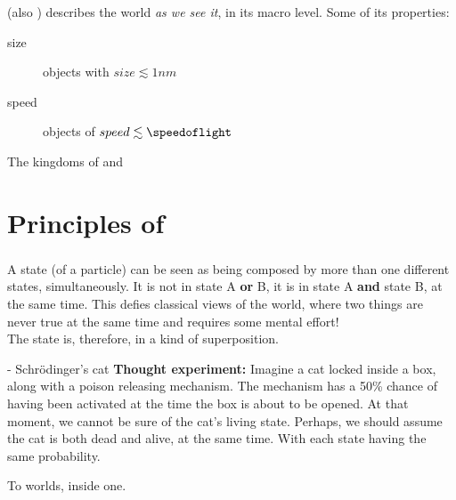 \documentclass[aspectratio=43]{beamer}
\begin{document}
\begin{frame}{\qp}
\begin{card}
    \qp (also \qm) describes the world \textit{as we see it}, in its macro level. Some of its properties:
    \begin{description}
        \item[size] objects with $size \lesssim 1nm$
        \item[speed] objects of $speed \lesssim \speedoflight$
    \end{description}
\end{card}
\pagenumber
\end{frame}

\begin{frame}{The kingdoms of \cl and \qm}
\begin{card}
    \centering{}
\end{card}
\pagenumber
\end{frame}

\section{Principles of \qm}
\subsubsection{\qsp}
\begin{frame}{\qsp}
    \begin{card}
        A \q state (of a particle) can be seen as being composed by more than one different states, simultaneously. It is not in state A \textbf{or} B, it is in state A \textbf{and} state B, at the same time. This defies classical views of the world, where two things are never true at the same time and requires some mental effort!\\
        The state is, therefore, in a kind of superposition.
    \end{card}
\pagenumber
\end{frame}

\begin{frame}{\qsp - Schrödinger's cat}
    \textbf{Thought experiment:} Imagine a cat locked inside a box, along with a poison releasing mechanism. The mechanism has a 50\% chance of having been activated at the time the box is about to be opened. At that moment, we cannot be sure of the cat's living state. Perhaps, we should assume the cat is both dead and alive, at the same time. With each state having the same probability.
    \begin{center}
    \end{center}
    \begin{center}
        To worlds, inside one.
    \end{center}
\pagenumber
\end{frame}
\end{document}

